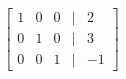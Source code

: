 \documentclass[preview]{standalone}
\begin{document}
\begin{align*}
\begin{bmatrix} 1 & 0 & 0 & | & 2 \\ 0 & 1 & 0 & | & 3 \\ 0 & 0 & 1 & | & -1 \end{bmatrix}
\end{align*}
\end{document}
